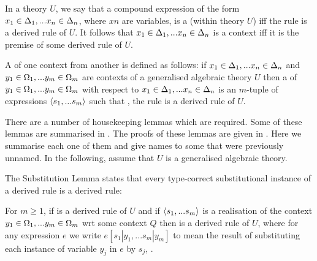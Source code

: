 In a theory $U$, we say that a compound expression of the form $x_1 \in \Delta_1,... x_{n} \in \Delta_{n}$, where $xn$ are variables, is a  (within theory $U$)  iff
the rule  is a derived rule of $U$. It follows that  $x_1 \in \Delta_1,... x_{n} \in \Delta_{n}$ is a context iff
it is the premise of some derived rule of $U$.

A  of one context from another is defined as follows: if $x_1 \in \Delta_1,... x_{n} \in \Delta_{n}$ and $y_1 \in \Omega_1,... y_{m} \in \Omega_{m}$ are contexts of a generalised algebraic theory $U$  then a  of  $y_1 \in \Omega_1,... y_{m} \in \Omega_{m}$ with respect to $x_1 \in \Delta_1,... x_{n} \in \Delta_{n}$ is an $m$-tuple of expressions $\langle s_1,...s_m\rangle$
such that \foreachj, the rule  is a derived rule of $U$.

 There are a number of housekeeping lemmas which are required. Some of these lemmas are summarised in \cite{Cartmell86}. The proofs of these lemmas 
	are given in \cite{Cartmell78}.
Here we summarise each one of them and give names to some that were previously unnamed. In the following, assume that $U$ is a generalised algebraic theory.



The Substitution Lemma states that every type-correct substitutional instance of a derived rule is a derived rule:
\begin{lemma}
For $m \geq 1$, if  is a derived rule of $U$
and  if $\langle s_1,...s_m\rangle$ is a realisation of the context $y_1 \in \Omega_1,... y_{m} \in \Omega_{m}$ wrt some context $Q$ 
then  is a derived rule of $U$, where
for any expression $e$ we write
$e[s_1|y_1,...s_m|y_m]$ to mean
the result of substituting each instance of variable $y_j$ in $e$ by $s_j$, \foreachj.
\end{lemma}

